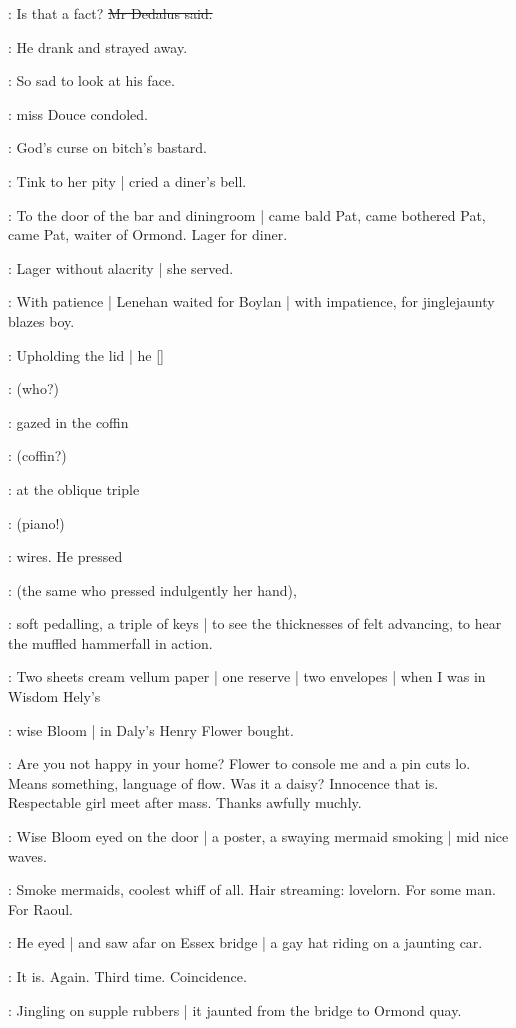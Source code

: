 \simon:
Is that a fact?
\sout{Mr Dedalus said.}

:
He drank and strayed away.

\MissD:
So sad to look at his face.

:
miss Douce condoled.

\stripling:
God's curse on bitch's bastard.

:
Tink to her pity |
cried a diner's bell.

:
To the door of the bar and diningroom |
came bald Pat,
came bothered Pat,
came Pat,
waiter of Ormond.
Lager for diner.

:
Lager without alacrity |
she served.

:
With patience  |
Lenehan waited for Boylan |
with impatience,
for jinglejaunty
blazes boy.

:
Upholding the lid |
he
[]

:
(who?)

:
gazed in the coffin

:
(coffin?)

:
at the oblique triple

:
(piano!)

:
wires.
He pressed

:
(the same who pressed indulgently her hand),

:
soft pedalling,
a triple of keys |
to see the thicknesses of felt advancing,
to hear the muffled hammerfall in action.

\BloomInt:
Two sheets cream vellum paper |
one reserve |
two envelopes |
when I was
in Wisdom Hely's

:
wise Bloom |
in Daly's Henry Flower bought.

\BloomInt:
Are you not happy in your home?
Flower to console me and a pin cuts lo.
Means something,
language of flow.
Was it a daisy?
Innocence that is.
Respectable girl meet after mass.
Thanks awfully muchly.

:
Wise Bloom eyed on the door |
a poster,
a swaying mermaid smoking |
mid nice waves.

\BloomInt:
Smoke mermaids,
coolest whiff of all.
Hair streaming:
lovelorn.
For some man.
For Raoul.

:
He eyed |
and saw afar on Essex bridge |
a gay hat riding on a jaunting car.

\BloomInt:
It is.
Again.
Third time.
Coincidence.

:
Jingling on supple rubbers |
it jaunted from the bridge to Ormond quay.

